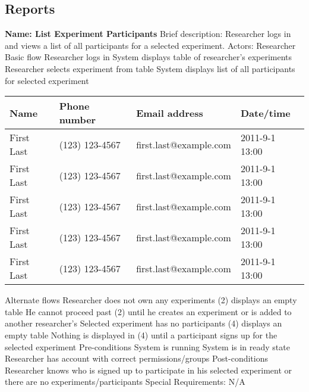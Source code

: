 \subsection{Reports}
\begin{outline}[enumerate]

\1 {\bf Name: List Experiment Participants}
\2 Brief description: Researcher logs in and views a list of all participants for a selected experiment.
\2 Actors: Researcher
\2 Basic flow
\3 Researcher logs in
\3 System displays table of researcher's experiments
\3 Researcher selects experiment from table
\3 System displays list of all participants for selected experiment
        \begin{table}
            \begin{tabular}{|l|l|l|l|}
                \hline
                Name       & Phone number   & Email address          & Date/time      \\ \hline
                First Last & (123) 123-4567 & first.last@example.com & 2011-9-1 13:00 \\
                First Last & (123) 123-4567 & first.last@example.com & 2011-9-1 13:00 \\
                First Last & (123) 123-4567 & first.last@example.com & 2011-9-1 13:00 \\
                First Last & (123) 123-4567 & first.last@example.com & 2011-9-1 13:00 \\
                First Last & (123) 123-4567 & first.last@example.com & 2011-9-1 13:00 \\
                \hline
            \end{tabular}
        \end{table}
\2 Alternate flows
\3 Researcher does not own any experiments
\4 (2) displays an empty table
\4 He cannot proceed past (2) until he creates an experiment or is added to another researcher's
\3 Selected experiment has no participants
\4 (4) displays an empty table
\4 Nothing is displayed in (4) until a participant signs up for the selected experiment
\2 Pre-conditions
\3 System is running
\3 System is in ready state
\3 Researcher has account with correct permissions/groups
\2 Post-conditions
\3 Researcher knows who is signed up to participate in his selected experiment or there are no experiments/participants
\2 Special Requirements:
\3 N/A



\end{outline}

